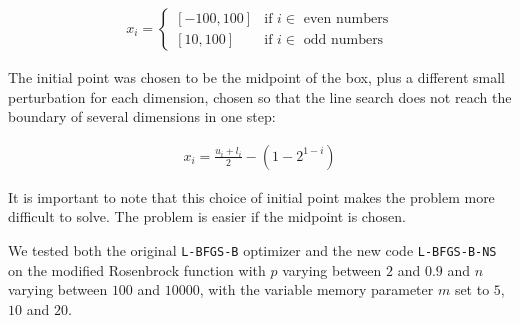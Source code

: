 \begin{equation}
  \begin{aligned}
    x_i = 
    \begin{cases}
      [-100, 100] & \text{if } i \in \text{ even numbers} \\
      [10, 100] & \text{if } i \in \text{ odd numbers}
    \end{cases}
  \end{aligned}
\end{equation}

The initial point was chosen to be the midpoint of the box, plus a different small perturbation for each dimension, chosen so that the line search does not reach the boundary of several dimensions in one step:

\begin{equation}
  \begin{aligned}
    x_i = \frac{u_i + l_i}{2} - \left(1 - 2^{1 - i}\right)
  \end{aligned}
\end{equation}

It is important to note that this choice of initial point makes the problem more difficult to solve. The problem is easier if the midpoint is chosen.

We tested both the original \texttt{L-BFGS-B} optimizer and the new code \texttt{L-BFGS-B-NS} on the modified Rosenbrock function with $p$ varying between $2$ and $0.9$ and $n$ varying between $100$ and $10000$, with the variable memory parameter $m$ set to $5$, $10$ and $20$.

